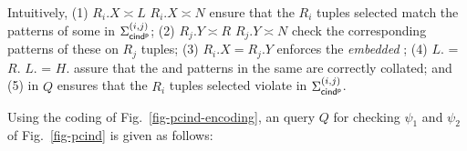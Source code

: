 Intuitively, (1) $R_i.X\asymp L$  $R_i.X\asymp N$ ensure
that the $R_i$ tuples selected match the \LHS patterns of some
\pCINDs in  $\Sigma_{{\mathsf{cind^p}}}^{(i,j)}$;
(2) $R_j.Y\asymp R$  $R_j.Y\asymp N$ check the corresponding
 \RHS patterns of these \pCINDs on
$R_j$ tuples;
(3) $R_i.X = R_j.Y$ enforces the
{\em embedded} \INDs; (4) $L$. = $R$.
 $L$. = $H$. assure that the \LHS and
\RHS patterns in the same \pCIND are correctly collated; and (5)  in $Q$ ensures that the $R_i$ tuples selected violate
\pCINDs in $\Sigma_{{\mathsf{cind^p}}}^{(i,j)}$.



\begin{example}\label{exa-cind-query}
Using the coding of Fig.~\ref{fig-pcind-encoding}, an \SQL query $Q$
for checking \pCINDs $\psi_1$ and $\psi_2$ of Fig.~\ref{fig-pcind}
is given as follows:


\begin{footnotesize}
\end{footnotesize}
\end{example}
